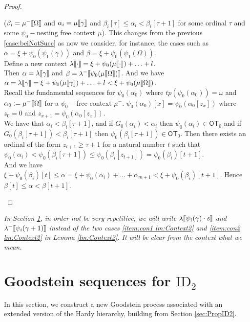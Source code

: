 \documentclass{amsart}
\theoremstyle{plain}
\theoremstyle{plain}
\def\scbrl{[\hspace{-.14em}[}
\def\scbrr{]\hspace{-.14em}]}
\def\scbr#1{\scbrl#1\scbrr}
\newcommand\OT{\mathsf{OT}}
\newcommand{\Om}{{\Omega}}
\newcommand{\al}{{\alpha}}
\newcommand{\be}{{\beta}}
\newcommand{\ga}{\gamma}
\newcommand{\la}{\lambda}
\newcommand{\om}{\omega}
\def\scbrl{[\hspace{-.14em}[}
\def\scbrr{]\hspace{-.14em}]}
\def\scbr#1{\scbrl#1\scbrr}
\begin{document}
\begin{proof}
\begin{Cases}
\begin{Cases}
        
        \item ($\be_i=\mu^-\scbr{\Om}$ and $\al_i=\mu\scbr{\ga}$ and $\be_i[\tau] \leq \al_i<\be_i[\tau+1]$ for some ordinal $\tau$ and some $\psi_0-$nesting free context $\mu$).
        This changes from the previous \ref{case:beiNotSucc} as now we consider, for instance, the cases such as $\al = \xi + \psi_0(\psi_1(\ga))$ and $\be = \xi  + \psi_0(\psi_1(\Om))$.\\
        Define a new context
        $\la\scbr{\cdot} = \xi+ \psi_0(\mu\scbr{\cdot})+\ldots + l$.\\
        Then $\al = \la\scbr{\ga}$ and $\be = \la^-\scbr{\psi_0(\mu\scbr{\Om})}$.
        And we have 
        $\al = \la\scbr{\ga} = \xi+ \psi_0(\mu\scbr{\ga})+\ldots + l < \xi+ \psi_0(\mu\scbr{\Om})$.
        \\
        Recall the fundamental sequences for $\psi_0(\al_0)$ where $tp(\psi_0(\al_0))=\om$ and $\al_0 :=\mu^-\scbr{\Om}$ for a $\psi_0-$free context $\mu^-$.
        $\psi_0(\al_0)[x] = \psi_0(\al_0[z_x])$ where $z_0=0$ and $z_{x+1}= \psi_0(\al_0[z_x])$.
        \\
        We have that $\al_i<\be_i[\tau+1]$, and if $G_0(\al_i)<\al_i$ then $\psi_0(\al_i) \in \OT_0$ and if $G_0(\be_i[\tau+1])< \be_i[\tau+1]$ then $\psi_0(\be_i[\tau+1]) \in \OT_0$.
        Then there exists an ordinal of the form $z_{t+1}\geq \tau+1$ for a natural number $t$ such that
        $\psi_0(\al_i) < \psi_0(\be_i[\tau+1]) \leq \psi_0(\be_i[z_{t+1}]) = \psi_0(\be_i)[t+1]$.
        \\
        And we have $\xi  +\psi_0(\be_i)[t] \leq \al =\xi + \psi_0(\al_i) +\ldots+\al_{m+1} < \xi  +\psi_0(\be_i)[t+1]$.
        Hence $\be[t] \leq \al < \be[t+1]$.\\
        
    \end{Cases}
\end{Cases}
\end{proof}

{\em In Section \ref{sec:GoodsteinID2}, in order not be very repetitive, we will write $\la\scbr{\psi_i(\ga)\cdot s}$ and $\la^-\scbr{\psi_i(\ga+1)}$ instead of the two cases \ref{item:con1 lm:Context2} and \ref{item:con2 lm:Context2} in Lemma \ref{lm:Context2}.
It will be clear from the context what we mean.}
\\




\section{Goodstein sequences for \texorpdfstring{$\mathrm{ID}_{2}$}{ID2}}
\label{sec:GoodsteinID2}
In this section, we construct a new Goodstein process associated with an extended version of the Hardy hierarchy, building from Section \ref{sec:PropID2}.
\end{document}
